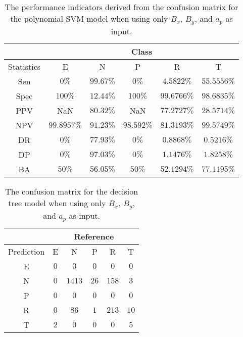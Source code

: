 \begin{table}[!ht]
	\centering
	\begin{tabular}{|c|c|c|c|c|c|}
		\hline
		 & \multicolumn{5}{c|}{Class} \\ \hline
		Statistics & E & N & P & R & T \\ \hline
		Sen & $0\%$ & $99.67\%$ & $0\%$ & $4.5822\%$ & $55.5556\%$ \\ \hline
		Spec & $100\%$ & $12.44\%$ & $100\%$ & $99.6766\%$ & $98.6835\%$ \\ \hline
		PPV & NaN & $80.32\%$ & NaN & $77.2727\%$ & $28.5714\%$ \\ \hline
		NPV & $99.8957\%$ & $91.23\%$ & $98.592\%$ & $81.3193\%$ & $99.5749\%$ \\ \hline
		DR & $0\%$ & $77.93\%$ & $0\%$ & $0.8868\%$ & $0.5216\%$ \\ \hline
		DP & $0\%$ & $97.03\%$ & $0\%$ & $1.1476\%$ & $1.8258\%$ \\ \hline
		BA & $50\%$ & $56.05\%$ & $50\%$ & $52.1294\%$ & $77.1195\%$ \\ \hline
	\end{tabular}
	\caption{The performance indicators derived from the confusion matrix for the polynomial SVM model when using only $B_{x}$, $B_{y}$, and $a_{p}$ as input.}
	\label{tab:cs:reverse:xyap:svmPoly}
\end{table}

\begin{table}[!ht]
	\centering
	\begin{tabular}{|c|c|c|c|c|c|}
		\hline
		 & \multicolumn{5}{|c|}{Reference} \\ \hline
		 Prediction & E & N & P & R & T \\ \hline
		 E & $0$ & $0$ & $0$ & $0$ & $0$ \\ \hline
		 N & $0$ & $1413$ & $26$ & $158$ & $3$ \\ \hline
		 P & $0$ & $0$ & $0$ & $0$ & $0$ \\ \hline
		 R & $0$ & $86$ & $1$ & $213$ & $10$ \\ \hline
		 T & $2$ & $0$ & $0$ & $0$ & $5$ \\ \hline
	\end{tabular}
	\caption{The confusion matrix for the decision tree model when using only $B_{x}$, $B_{y}$, and $a_{p}$ as input.}
	\label{tab:cm:xyap:C5.0}
\end{table}

